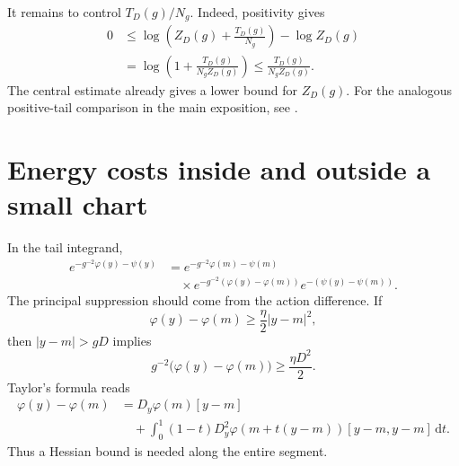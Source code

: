 \documentclass[10pt,reqno]{amsart}
\theoremstyle{definition}
\theoremstyle{remark}
\numberwithin{equation}{section}
\numberwithin{figure}{section}
\newcommand{\dd}{\mathrm d}
\begin{document}
It remains to control $T_D(g)/N_g$. Indeed, positivity gives
\begin{equation}\label{eq:tail-log-comparison}
\begin{aligned}
0&\le\log\left(Z_D(g)+\frac{T_D(g)}{N_g}\right)-\log Z_D(g)\\
&=\log\left(1+\frac{T_D(g)}{N_gZ_D(g)}\right)
\le\frac{T_D(g)}{N_gZ_D(g)}.
\end{aligned}
\end{equation}
The central estimate already gives a lower bound for $Z_D(g)$.
For the analogous positive-tail comparison in the main exposition, see
\cite[Lemma~12.7, p.~44]{Exposition}.

\section{Energy costs inside and outside a small chart}\label{sec:chart-costs}
In the tail integrand,
\begin{equation}\label{eq:tail-energy-factorization}
\begin{aligned}
e^{-g^{-2}\varphi(y)-\psi(y)}
&=e^{-g^{-2}\varphi(m)-\psi(m)}\\
&\quad\times e^{-g^{-2}(\varphi(y)-\varphi(m))}
e^{-(\psi(y)-\psi(m))}.
\end{aligned}
\end{equation}
The principal suppression should come from the action difference.
If
\begin{equation}\label{eq:desired-quadratic-cost}
\varphi(y)-\varphi(m)\ge\frac\eta2|y-m|^2,
\end{equation}
then $|y-m|>gD$ implies
\begin{equation}\label{eq:tail-quadratic-cost}
g^{-2}\bigl(\varphi(y)-\varphi(m)\bigr)\ge\frac{\eta D^2}{2}.
\end{equation}
Taylor's formula reads
\begin{equation}\label{eq:tail-line-taylor}
\begin{aligned}
\varphi(y)-\varphi(m)
&=D_y\varphi(m)[y-m]\\
&\quad+\int_0^1(1-t)
D_y^2\varphi(m+t(y-m))[y-m,y-m]\,\dd t.
\end{aligned}
\end{equation}
Thus a Hessian bound is needed along the entire segment.
\end{document}
